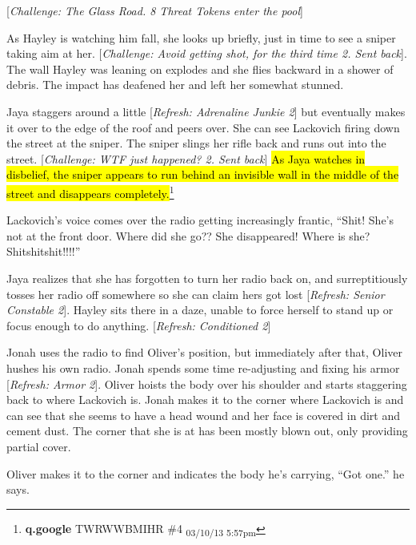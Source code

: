 {[}\textit{Challenge: The Glass Road.  8 Threat Tokens enter the pool}{]}



As Hayley is watching him fall, she looks up briefly, just in time to see a sniper taking aim at her.  {[}\textit{Challenge: Avoid getting shot, for the third time 2.  Sent back}{]}.  The wall Hayley was leaning on explodes and she flies backward in a shower of debris.  The impact has deafened her and left her somewhat stunned.



Jaya staggers around a little {[}\textit{Refresh: Adrenaline Junkie 2}{]} but eventually makes it over to the edge of the roof and peers over.  She can see Lackovich firing down the street at the sniper.  The sniper slings her rifle back and runs out into the street. {[}\textit{Challenge: WTF just happened? 2. Sent back}{]}  \hl{As Jaya watches in disbelief, the sniper appears to run behind an invisible wall in the middle of the street and disappears completely.}\footnote{\textbf{q.google }TWRWWBMIHR \#4 \textsubscript{03/10/13 5:57pm}}



Lackovich's voice comes over the radio getting increasingly frantic, ``Shit!  She's not at the front door.  Where did she go??  She disappeared!  Where is she?  Shitshitshit!!!!''



Jaya realizes that she has forgotten to turn her radio back on, and surreptitiously tosses her radio off somewhere so she can claim hers got lost {[}\textit{Refresh: Senior Constable 2}{]}.  Hayley sits there in a daze, unable to force herself to stand up or focus enough to do anything. {[}\textit{Refresh: Conditioned 2}{]}



Jonah uses the radio to find Oliver's position, but immediately after that, Oliver hushes his own radio.  Jonah spends some time re-adjusting and fixing his armor {[}\textit{Refresh: Armor 2}{]}. Oliver hoists the body over his shoulder and starts staggering back to where Lackovich is.  Jonah makes it to the corner where Lackovich is and can see that she seems to have a head wound and her face is covered in dirt and cement dust.  The corner that she is at has been mostly blown out, only providing partial cover.



Oliver makes it to the corner and indicates the body he's carrying, ``Got one.'' he says.

